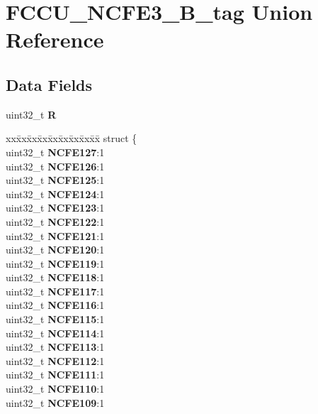 \hypertarget{unionFCCU__NCFE3__32B__tag}{}\section{F\+C\+C\+U\+\_\+\+N\+C\+F\+E3\+\_\+B\+\_\+tag Union Reference}
\label{unionFCCU__NCFE3__32B__tag}
\subsection*{Data Fields}
\begin{DoxyCompactItemize}
\item 
\mbox{\label{unionFCCU__NCFE3__32B__tag_aa12b9f4dc2024b051df2144f8107deb8}} 
uint32\+\_\+t {\bfseries R}
\item 
\mbox{\label{unionFCCU__NCFE3__32B__tag_adb1292addcc2069f1261720e1f1f1efc}} 
\begin{tabbing}
xx\=xx\=xx\=xx\=xx\=xx\=xx\=xx\=xx\=\kill
struct \{\\
\>uint32\_t {\bfseries NCFE127}:1\\
\>uint32\_t {\bfseries NCFE126}:1\\
\>uint32\_t {\bfseries NCFE125}:1\\
\>uint32\_t {\bfseries NCFE124}:1\\
\>uint32\_t {\bfseries NCFE123}:1\\
\>uint32\_t {\bfseries NCFE122}:1\\
\>uint32\_t {\bfseries NCFE121}:1\\
\>uint32\_t {\bfseries NCFE120}:1\\
\>uint32\_t {\bfseries NCFE119}:1\\
\>uint32\_t {\bfseries NCFE118}:1\\
\>uint32\_t {\bfseries NCFE117}:1\\
\>uint32\_t {\bfseries NCFE116}:1\\
\>uint32\_t {\bfseries NCFE115}:1\\
\>uint32\_t {\bfseries NCFE114}:1\\
\>uint32\_t {\bfseries NCFE113}:1\\
\>uint32\_t {\bfseries NCFE112}:1\\
\>uint32\_t {\bfseries NCFE111}:1\\
\>uint32\_t {\bfseries NCFE110}:1\\
\>uint32\_t {\bfseries NCFE109}:1\\

\end{tabbing}
\end{DoxyCompactItemize}
